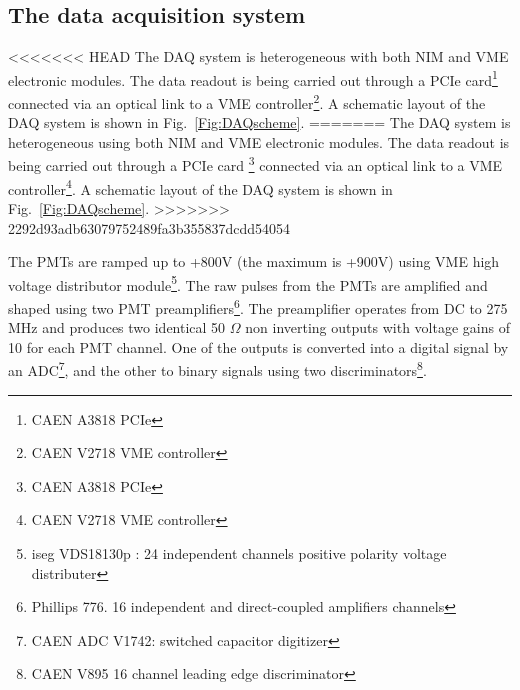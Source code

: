 \subsection{The data acquisition system }
\label{sec:DAQ}


<<<<<<< HEAD
The DAQ system is heterogeneous with both 
NIM and VME electronic modules. The data readout is being carried out through a PCIe card\footnote{CAEN A3818 PCIe} 
connected via an optical link to a VME controller\footnote{CAEN V2718 VME controller}. A schematic layout of the DAQ system is shown in Fig.~{\ref{Fig:DAQscheme}}. 
=======
The DAQ system is heterogeneous using both 
NIM and VME electronic modules. The data readout is being carried out through a PCIe card \footnote{CAEN A3818 PCIe}  connected via an optical link to a VME controller\footnote{CAEN V2718 VME controller}. A schematic layout of the DAQ system is shown in Fig.~{\ref{Fig:DAQscheme}}. 
>>>>>>> 2292d93adb63079752489fa3b355837dcdd54054


The PMTs are ramped up to +800V (the maximum is +900V) using VME high voltage distributor module\footnote{iseg VDS18130p : 
24 independent channels positive polarity voltage distributer}. The raw pulses from the PMTs are amplified and shaped using 
two PMT preamplifiers\footnote{Phillips 776. 16 independent and direct-coupled amplifiers channels}. The preamplifier operates 
from DC to 275 MHz and produces two identical 50 $\Omega$ non inverting outputs with voltage gains of 10 for each PMT channel. One 
of the outputs is converted into a digital signal by an ADC\footnote{CAEN ADC V1742: switched capacitor digitizer}, and the other to 
binary signals using two discriminators\footnote{CAEN V895 16 channel leading edge discriminator}.

